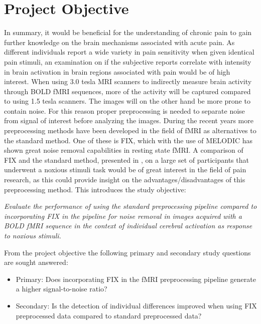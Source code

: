 \chapter{Project Objective}

In summary, it would be beneficial for the understanding of chronic pain to gain further knowledge on the brain mechanisms associated with acute pain. As different individuals report a wide variety in pain sensitivity when given identical pain stimuli, an examination on if the subjective reports correlate with intensity in brain activation in brain regions associated with pain would be of high interest. When using 3.0 tesla MRI scanners to indirectly measure brain activity through BOLD fMRI sequences, more of the activity will be captured compared to using 1.5 tesla scanners. The images will on the other hand be more prone to contain noise. For this reason proper preprocessing is needed to separate noise from signal of interest before analyzing the images. During the recent years more preprocessing methods have been developed in the field of fMRI as alternatives to the standard method. One of these is FIX, which with the use of MELODIC has shown great noise removal capabilities in resting state fMRI. A comparison of FIX and the standard method, presented in , on a large set of participants that underwent a noxious stimuli task would be of great interest in the field of pain research, as this could provide insight on the advantages/disadvantages of this preprocessing method. This introduces the study objective:

\begin{center}

\textit{Evaluate the performance of using the standard preprocessing pipeline compared to incorporating FIX in the pipeline for noise removal in images acquired with a BOLD fMRI sequence in the context of individual cerebral activation as response to noxious stimuli.}

\end{center}

From the project objective the following primary and secondary study questions are sought answered: 

\begin{itemize}
	\item Primary: Does incorporating FIX in the fMRI preprocessing pipeline generate a higher signal-to-noise ratio?
	
	\item Secondary: Is the detection of individual differences improved when using FIX preprocessed data compared to standard preprocessed data?
	   
	 
\end{itemize}

